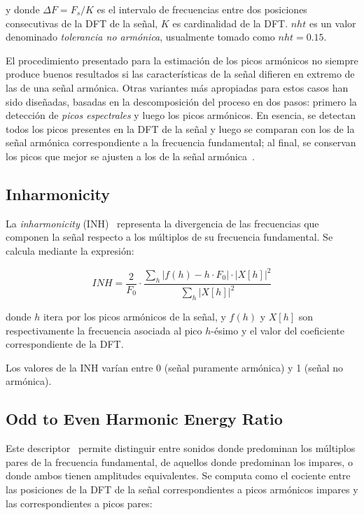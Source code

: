 \noindent
y donde $\Delta F = F_{s}/K$ es el intervalo de frecuencias entre dos posiciones consecutivas de la DFT de la señal, $K$ es cardinalidad de la DFT\@.
$nht$ es un valor denominado \textit{tolerancia no armónica}, usualmente tomado como $nht = 0.15$.

El procedimiento presentado para la estimación de los picos armónicos no siempre produce buenos resultados si las características de la señal difieren en extremo de las de una señal armónica.
Otras variantes más apropiadas para estos casos han sido diseñadas, basadas en la descomposición del proceso en dos pasos: primero la detección de \textit{picos espectrales} y luego los picos armónicos.
En esencia, se detectan todos los picos presentes en la DFT de la señal y luego se comparan con los de la señal armónica correspondiente a la frecuencia fundamental;
al final, se conservan los picos que mejor se ajusten a los de la señal armónica~\cite{Kim05}.

\subsection{Inharmonicity}\label{subsec:inharmonicity}

La \textit{inharmonicity} (INH)~\cite{Peters04,Zamanian17} representa la divergencia de las frecuencias que componen la señal respecto a los múltiplos de su frecuencia fundamental.
Se calcula mediante la expresión:

\begin{equation}
    \label{eq:INH}
    INH = \frac{2}{F_0} \cdot \frac{\sum_{h}{|f(h) - h\cdot F_0|\cdot |X[h]|^2}}{\sum_{h}{|X[h]|^2}}
\end{equation}

\noindent
donde $h$ itera por los picos armónicos de la señal, y $f(h)$ y $X[h]$ son respectivamente la frecuencia asociada al pico $h$-ésimo y el valor del coeficiente correspondiente de la DFT\@.

Los valores de la INH varían entre 0 (señal puramente armónica) y 1 (señal no armónica).

\subsection{Odd to Even Harmonic Energy Ratio}\label{subsec:oddToEvenHarmonicEnergyRatio}

Este descriptor~\cite{Gunasekaran11,Peters04} permite distinguir entre sonidos donde predominan los múltiplos pares de la frecuencia fundamental, de aquellos donde predominan los impares, o donde ambos tienen amplitudes equivalentes.
Se computa como el cociente entre las posiciones de la DFT de la señal correspondientes a picos armónicos impares y las correspondientes a picos pares:

